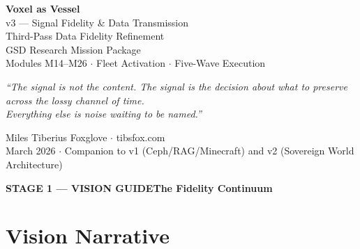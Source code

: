 \documentclass[11pt,letterpaper]{article}
\newcommand{\stageheader}[2]{%
  \begin{tcolorbox}[colback=Primary,colframe=Primary,arc=2pt,left=8pt,right=8pt,top=6pt,bottom=6pt]
    \textbf{\large\sffamily\color{white}#1}\hfill\textbf{\sffamily\color{white!80!Primary}#2}
  \end{tcolorbox}%
}
\begin{document}
\begin{titlepage}
\pagecolor{Primary}
\color{white}
\vspace*{2cm}
\begin{center}
{\fontsize{28}{34}\selectfont\sffamily\bfseries Voxel as Vessel}\\[0.4em]
{\fontsize{18}{24}\selectfont\sffamily v3 --- Signal Fidelity \& Data Transmission}\\[0.8em]
{\fontsize{13}{18}\selectfont\sffamily\color{white!75!Primary} Third-Pass Data Fidelity Refinement}\\[2.5cm]

{\large\sffamily GSD Research Mission Package}\\[0.5em]
{\normalsize\sffamily Modules M14--M26 $\cdot$ Fleet Activation $\cdot$ Five-Wave Execution}\\[3cm]

\begin{tcolorbox}[colback=white!15!Primary,colframe=white!30!Primary,arc=4pt,width=0.82\textwidth]
\centering\itshape\color{white}
``The signal is not the content. The signal is the \emph{decision} about what to preserve across the lossy channel of time.\\
Everything else is noise waiting to be named.''
\end{tcolorbox}

\vfill
{\normalsize\sffamily Miles Tiberius Foxglove $\cdot$ tibsfox.com}\\[0.3em]
{\small\sffamily\color{white!70!Primary} March 2026 $\cdot$ Companion to v1 (Ceph/RAG/Minecraft) and v2 (Sovereign World Architecture)}
\end{center}
\end{titlepage}
\pagecolor{white}

\tableofcontents
\newpage

\stageheader{STAGE 1 — VISION GUIDE}{The Fidelity Continuum}

\section{Vision Narrative}
\end{document}
